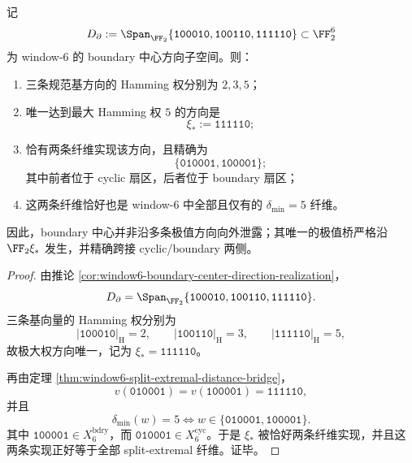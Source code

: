 \begin{theorem}\label{thm:conclusion-window6-boundary-center-unique-extremal-bridge}
记
\[
D_{\partial}
:=
\Span_{\FF_2}\{\texttt{100010},\texttt{100110},\texttt{111110}\}
\subset \FF_2^6
\]
为 window-\(6\) 的 boundary 中心方向子空间。则：
\begin{enumerate}
  \item 三条规范基方向的 Hamming 权分别为 \(2,3,5\)；
  \item 唯一达到最大 Hamming 权 \(5\) 的方向是
  \[
  \xi_\ast:=\texttt{111110};
  \]
  \item 恰有两条纤维实现该方向，且精确为
  \[
  \{\texttt{010001},\texttt{100001}\};
  \]
  其中前者位于 cyclic 扇区，后者位于 boundary 扇区；
  \item 这两条纤维恰好也是 window-\(6\) 中全部且仅有的 \(\delta_{\min}=5\) 纤维。
\end{enumerate}
因此，boundary 中心并非沿多条极值方向向外泄露；其唯一的极值桥严格沿 \(\FF_2\xi_\ast\) 发生，并精确跨接 cyclic/boundary 两侧。
\end{theorem}
\begin{proof}
由推论 \ref{cor:window6-boundary-center-direction-realization}，
\[
D_{\partial}
=
\Span_{\FF_2}\{\texttt{100010},\texttt{100110},\texttt{111110}\}.
\]
三条基向量的 Hamming 权分别为
\[
|\texttt{100010}|_{\mathrm H}=2,\qquad
|\texttt{100110}|_{\mathrm H}=3,\qquad
|\texttt{111110}|_{\mathrm H}=5,
\]
故极大权方向唯一，记为 \(\xi_\ast=\texttt{111110}\)。

再由定理 \ref{thm:window6-split-extremal-distance-bridge}，
\[
v(\texttt{010001})=v(\texttt{100001})=\texttt{111110},
\]
并且
\[
\delta_{\min}(w)=5
\iff
w\in\{\texttt{010001},\texttt{100001}\}.
\]
其中 \(\texttt{100001}\in X_6^{\mathrm{bdry}}\)，而 \(\texttt{010001}\in X_6^{\mathrm{cyc}}\)。于是 \(\xi_\ast\) 被恰好两条纤维实现，并且这两条实现正好等于全部 split-extremal 纤维。证毕。
\end{proof}

